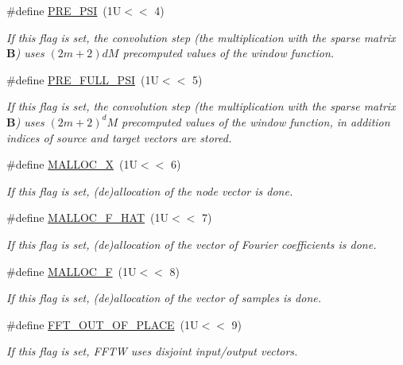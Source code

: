 \begin{CompactItemize}
\#define \hyperlink{group__nfft_g959463a5c7723ccef5057ddcb784b40c}{PRE\_\-PSI}~(1U$<$$<$ 4)
\begin{CompactList}\small\item\em If this flag is set, the convolution step (the multiplication with the sparse matrix $\mathbf{B}$) uses $(2m+2)dM$ precomputed values of the window function. \item\end{CompactList}\item 
\#define \hyperlink{group__nfft_g7ad8a7e19519b16340dabec48899c6a4}{PRE\_\-FULL\_\-PSI}~(1U$<$$<$ 5)
\begin{CompactList}\small\item\em If this flag is set, the convolution step (the multiplication with the sparse matrix $\mathbf{B}$) uses $(2m+2)^dM$ precomputed values of the window function, in addition indices of source and target vectors are stored. \item\end{CompactList}\item 
\#define \hyperlink{group__nfft_g353185384f87de0dc4320a82652ef724}{MALLOC\_\-X}~(1U$<$$<$ 6)
\begin{CompactList}\small\item\em If this flag is set, (de)allocation of the node vector is done. \item\end{CompactList}\item 
\#define \hyperlink{group__nfft_g02d52cb02b6cfdbc3e4d5fd4de1aef9e}{MALLOC\_\-F\_\-HAT}~(1U$<$$<$ 7)
\begin{CompactList}\small\item\em If this flag is set, (de)allocation of the vector of Fourier coefficients is done. \item\end{CompactList}\item 
\#define \hyperlink{group__nfft_ga7b5098f4136080bbe0dd989973e2a69}{MALLOC\_\-F}~(1U$<$$<$ 8)
\begin{CompactList}\small\item\em If this flag is set, (de)allocation of the vector of samples is done. \item\end{CompactList}\item 
\#define \hyperlink{group__nfft_g9193f768d5839892d0e303080c370eaf}{FFT\_\-OUT\_\-OF\_\-PLACE}~(1U$<$$<$ 9)
\begin{CompactList}\small\item\em If this flag is set, FFTW uses disjoint input/output vectors. \item\end{CompactList}\item 

\end{CompactItemize}
